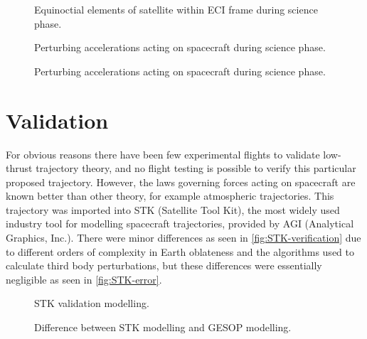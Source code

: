 \begin{figure}
\centering
\def\svgwidth{\figurewidth}

\caption{Equinoctial elements of satellite within ECI frame during science phase.}
\label{fig:Science-mee}
\end{figure}

\begin{figure}
\centering
\def\svgwidth{\figurewidth}

\caption{Perturbing accelerations acting on spacecraft during science phase.}
\label{fig:Science-pert}
\end{figure}

\begin{figure}
\centering
\def\svgwidth{\figurewidth}

\caption{Perturbing accelerations acting on spacecraft during science phase.}
\label{fig:Science-pert2}
\end{figure}


\section{Validation} \label{sec:Validation}
For obvious reasons there have been few experimental flights to validate low-thrust trajectory theory, and no flight testing is possible to verify this particular proposed trajectory. However, the laws governing forces acting on spacecraft are known better than other theory, for example atmospheric trajectories. This trajectory was imported into STK (Satellite Tool Kit), the most widely used industry tool for modelling spacecraft trajectories, provided by AGI (Analytical Graphics, Inc.). There were minor differences as seen in \autoref{fig:STK-verification} due to different orders of complexity in Earth oblateness and the algorithms used to calculate third body perturbations, but these differences were essentially negligible as seen in \autoref{fig:STK-error}.

\begin{figure}
\centering
\caption{STK validation modelling.}
\label{fig:STK-verification}
\end{figure}

\begin{figure}
\centering
\caption{Difference between STK modelling and GESOP modelling.}
\label{fig:STK-error}
\end{figure}

